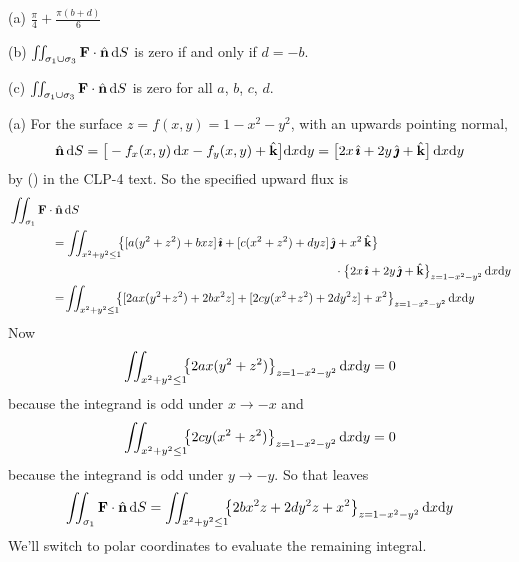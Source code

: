 \begin{answer} 
(a) $\frac{\pi}{4} +\frac{\pi(b+d)}{6}$

(b) $\iint_{\sigma_1\cup\sigma_3} \mathbf{F}\cdot\hat{\mathbf{n}}\,\mathrm{d}S$ is zero 
if and only if $d=-b$.

(c) $\iint_{\sigma_1\cup\sigma_3} \mathbf{F}\cdot\hat{\mathbf{n}}\,\mathrm{d}S$ is zero 
  for all $a$, $b$, $c$, $d$.
\end{answer}

\begin{solution} (a) For the surface $z=f(x,y)=1-x^2-y^2$, with an upwards
pointing normal,
\begin{equation*}
\hat{\mathbf{n}}\,\mathrm{d}S = \big[-f_x(x,y)\,\mathrm{d}x -f_y(x,y) +\hat{\mathbf{k}}\big]\mathrm{d}x\mathrm{d}y
             = \big[2x\,\hat{\pmb{\imath}} + 2y\,\hat{\pmb{\jmath}} +\hat{\mathbf{k}}\big]\,\mathrm{d}x\mathrm{d}y
\end{equation*}
by () in the CLP-4 text.
So the specified upward flux is
\begin{align*}
&\dblInt_{\sigma_1} \vF\cdot\hn\,\dee{S} \\
&\hskip0.5in=\dblInt_{x^2+y^2\le 1}\hskip-5pt
         \big\{[ a ( y^2 + z^2 ) + bxz ]\,\hi 
          + [ c ( x^2 + z^2 ) + dyz ]\,\hj + x^2\,\hk\big\}\\
&\hskip3.8in\cdot
            \big\{2x\,\hi + 2y\,\hj +\hk\big\}_{z=1 - x^2 - y^2}
         \,\dee{x}\dee{y} \\
&\hskip0.5in=\!\dblInt_{x^2+y^2\le 1}\hskip-5pt
         \big\{[2a x( y^2 \!+\! z^2 ) + 2bx^2z ]
          + [2cy ( x^2 \!+\! z^2 ) +2 dy^2z ] + x^2\big\}_{z=1 - x^2 - y^2}
         \,\dee{x}\dee{y} \\
\end{align*}
Now
\begin{equation*}
\iint_{x^2+y^2\le 1}\hskip-5pt
         \big\{2a x( y^2 + z^2 ) \big\}_{z=1 - x^2 - y^2}
         \,\mathrm{d}x\mathrm{d}y =0
\end{equation*}
because the integrand is odd under $x\rightarrow -x$ and
\begin{equation*}
\iint_{x^2+y^2\le 1}\hskip-5pt
         \big\{2cy ( x^2 + z^2 )\big\}_{z=1 - x^2 - y^2}
         \,\mathrm{d}x\mathrm{d}y =0 
\end{equation*}
because the integrand is odd under $y\rightarrow -y$. So that leaves
\begin{equation*}
\iint_{\sigma_1} \mathbf{F}\cdot\hat{\mathbf{n}}\,\mathrm{d}S
=\iint_{x^2+y^2\le 1}\hskip-5pt
         \big\{ 2bx^2z +2 dy^2z  + x^2\big\}_{z=1 - x^2 - y^2}
         \,\mathrm{d}x\mathrm{d}y
\end{equation*}
We'll switch to polar coordinates to evaluate the remaining integral.

\end{solution}
